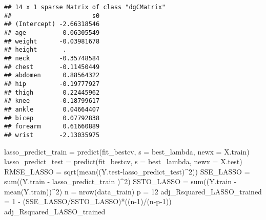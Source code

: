 \documentclass[
]{article}
\newenvironment{Shaded}{\begin{snugshade}}{\end{snugshade}}
\newcommand{\AttributeTok}[1]{\textcolor[rgb]{0.77,0.63,0.00}{#1}}
\newcommand{\DecValTok}[1]{\textcolor[rgb]{0.00,0.00,0.81}{#1}}
\newcommand{\FunctionTok}[1]{\textcolor[rgb]{0.00,0.00,0.00}{#1}}
\newcommand{\NormalTok}[1]{#1}
\newcommand{\OtherTok}[1]{\textcolor[rgb]{0.56,0.35,0.01}{#1}}
\newcommand{\SpecialCharTok}[1]{\textcolor[rgb]{0.00,0.00,0.00}{#1}}
\begin{document}
\begin{Shaded}
\end{Shaded}

\begin{verbatim}
## 14 x 1 sparse Matrix of class "dgCMatrix"
##                      s0
## (Intercept) -2.66318546
## age          0.06305549
## weight      -0.03981678
## height       .         
## neck        -0.35748584
## chest       -0.11450449
## abdomen      0.88564322
## hip         -0.19777927
## thigh        0.22445962
## knee        -0.18799617
## ankle        0.04664407
## bicep        0.07792838
## forearm      0.61660889
## wrist       -2.13035975
\end{verbatim}

\begin{Shaded}
\begin{Highlighting}[]
\NormalTok{lasso\_predict\_train }\OtherTok{=} \FunctionTok{predict}\NormalTok{(fit\_bestcv, }\AttributeTok{s =}\NormalTok{ best\_lambda, }\AttributeTok{newx =}\NormalTok{ X.train)}
\NormalTok{lasso\_predict\_test }\OtherTok{=} \FunctionTok{predict}\NormalTok{(fit\_bestcv, }\AttributeTok{s =}\NormalTok{ best\_lambda, }\AttributeTok{newx =}\NormalTok{ X.test)}
\NormalTok{RMSE\_LASSO }\OtherTok{=} \FunctionTok{sqrt}\NormalTok{(}\FunctionTok{mean}\NormalTok{((Y.test}\SpecialCharTok{{-}}\NormalTok{lasso\_predict\_test)}\SpecialCharTok{\^{}}\DecValTok{2}\NormalTok{))}
\NormalTok{SSE\_LASSO }\OtherTok{=} \FunctionTok{sum}\NormalTok{((Y.train }\SpecialCharTok{{-}}\NormalTok{ lasso\_predict\_train )}\SpecialCharTok{\^{}}\DecValTok{2}\NormalTok{)}
\NormalTok{SSTO\_LASSO }\OtherTok{=} \FunctionTok{sum}\NormalTok{((Y.train }\SpecialCharTok{{-}} \FunctionTok{mean}\NormalTok{(Y.train))}\SpecialCharTok{\^{}}\DecValTok{2}\NormalTok{)}
\NormalTok{n }\OtherTok{=} \FunctionTok{nrow}\NormalTok{(data\_train)}
\NormalTok{p }\OtherTok{=} \DecValTok{12}
\NormalTok{adj\_Rsquared\_LASSO\_trained }\OtherTok{=} \DecValTok{1} \SpecialCharTok{{-}}\NormalTok{ (SSE\_LASSO}\SpecialCharTok{/}\NormalTok{SSTO\_LASSO)}\SpecialCharTok{*}\NormalTok{((n}\DecValTok{{-}1}\NormalTok{)}\SpecialCharTok{/}\NormalTok{(n}\SpecialCharTok{{-}}\NormalTok{p}\DecValTok{{-}1}\NormalTok{))}
\NormalTok{adj\_Rsquared\_LASSO\_trained}
\end{Highlighting}
\end{Shaded}
\end{document}
